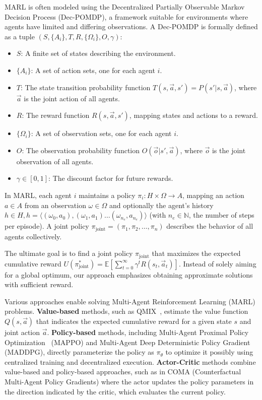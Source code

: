\documentclass[conference]{IEEEtran}
\begin{document}
MARL is often modeled using the Decentralized Partially Observable Markov Decision Process (Dec-POMDP), a framework suitable for environments where agents have limited and differing observations. A Dec-POMDP is formally defined as a tuple $(S, \{A_i\}, T, R, \{\Omega_i\}, O, \gamma)$:

\begin{itemize}
    \item $S$: A finite set of states describing the environment.
    \item $\{A_i\}$: A set of action sets, one for each agent $i$.
    \item $T$: The state transition probability function $T(s, \vec{a}, s') = P(s'|s, \vec{a})$, where $\vec{a}$ is the joint action of all agents.
    \item $R$: The reward function $R(s, \vec{a}, s')$, mapping states and actions to a reward.
    \item $\{\Omega_i\}$: A set of observation sets, one for each agent $i$.
    \item $O$: The observation probability function $O(\vec{o} | s', \vec{a})$, where $\vec{o}$ is the joint observation of all agents.
    \item $\gamma \in [0,1]$: The discount factor for future rewards.
\end{itemize}

In MARL, each agent $i$ maintains a policy $\pi_i: H \times \Omega \rightarrow A$, mapping an action $a \in A$ from an observation $\omega \in \Omega$ and optionally the agent's history $h \in H, h=\langle(\omega_0,a_0),(\omega_1,a_1)\dots(\omega_{n_e},a_{n_e})\rangle$ (with $n_e \in \mathbb{N}$, the number of steps per episode). A joint policy $\pi_{\text{joint}} = (\pi_1, \pi_2, \ldots, \pi_n)$ describes the behavior of all agents collectively.

The ultimate goal is to find a joint policy $\pi_{\text{joint}}$ that maximizes the expected cumulative reward $U(\pi^*_{\text{joint}}) = \mathbb{E}\left[\sum_{t=0}^{\infty} \gamma^t R(s_t, \vec{a}_t)\right]$. Instead of solely aiming for a global optimum, our approach emphasizes obtaining approximate solutions with sufficient reward.

Various approaches enable solving Multi-Agent Reinforcement Learning (MARL) problems. \textbf{Value-based} methods, such as QMIX~\cite{rashid2018}, estimate the value function $Q(s,\vec{a})$ that indicates the expected cumulative reward for a given state $s$ and joint action $\vec{a}$. \textbf{Policy-based} methods, including Multi-Agent Proximal Policy Optimization~\cite{yu2022surprising} (MAPPO) and Multi-Agent Deep Deterministic Policy Gradient~\cite{lowe2017multi} (MADDPG), directly parameterize the policy as $\pi_\theta$ to optimize it possibly using centralized training and decentralized execution. \textbf{Actor-Critic} methods combine value-based and policy-based approaches, such as in COMA (Counterfactual Multi-Agent Policy Gradients) where the actor updates the policy parameters in the direction indicated by the critic, which evaluates the current policy.
\end{document}

